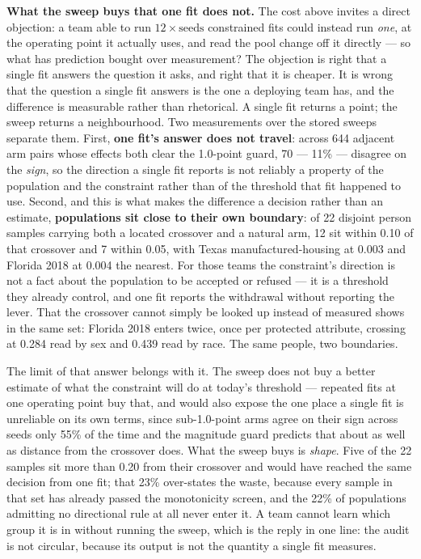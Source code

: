 \documentclass[conference]{IEEEtran}
\begin{document}
\textbf{What the sweep buys that one fit does not.} The cost above invites a direct
objection: a team able to run $12 \times \mathrm{seeds}$ constrained fits could instead run
\emph{one}, at the operating point it actually uses, and read the pool change off it
directly --- so what has prediction bought over measurement? The objection is right that a
single fit answers the question it asks, and right that it is cheaper. It is wrong that the
question a single fit answers is the one a deploying team has, and the difference is
measurable rather than rhetorical. A single fit returns a point; the sweep returns a
neighbourhood. Two measurements over the stored sweeps separate them. First, \textbf{one
fit's answer does not travel}: across 644 adjacent arm pairs whose effects both clear the 1.0-point guard, 70 --- 11\% --- disagree on the \emph{sign}, so the direction a single fit
reports is not reliably a property of the population and the constraint rather than of the
threshold that fit happened to use. Second, and this is what makes the difference a decision
rather than an estimate, \textbf{populations sit close to their own boundary}: of 22 disjoint person samples carrying both a located crossover and a natural arm, 12 sit within 0.10 of that crossover and 7 within 0.05, with Texas manufactured-housing at 0.003 and Florida 2018 at 0.004 the nearest. For those teams
the constraint's direction is not a fact about the population to be accepted or refused ---
it is a threshold they already control, and one fit reports the withdrawal without reporting
the lever. That the crossover cannot simply be looked up instead of measured shows in the
same set: Florida 2018 enters twice, once per protected attribute, crossing at 0.284 read by
sex and 0.439 read by race. The same people, two boundaries.

The limit of that answer belongs with it. The sweep does not buy a better estimate of what
the constraint will do at today's threshold --- repeated fits at one operating point buy
that, and would also expose the one place a single fit is unreliable on its own terms, since
sub-1.0-point arms agree on their sign across seeds only 55\% of the time and the magnitude
guard predicts that about as well as distance from the crossover does. What the sweep buys
is \emph{shape}. Five of the 22 samples sit more than 0.20 from their crossover and would
have reached the same decision from one fit; that 23\% over-states the waste, because every
sample in that set has already passed the monotonicity screen, and the 22\% of populations
admitting no directional rule at all never enter it. A team cannot learn which group it is
in without running the sweep, which is the reply in one line: the audit is not circular,
because its output is not the quantity a single fit measures.
\end{document}
